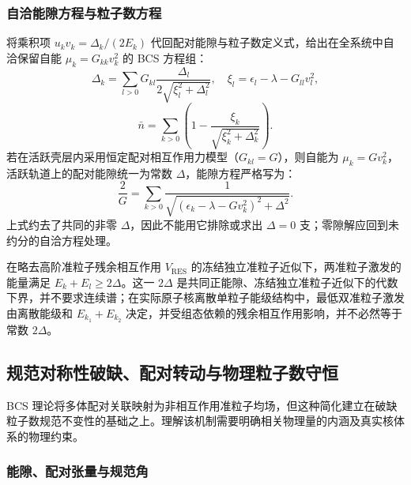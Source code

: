 \subsubsection{自洽能隙方程与粒子数方程}\label{sec:2-3-自洽能隙方程与粒子数方程}


将乘积项 $u_k v_k = \Delta_k / (2E_k)$ 代回配对能隙与粒子数定义式，给出在全系统中自洽保留自能 $\mu_k = G_{kk} v_k^2$ 的 BCS 方程组：
\begin{equation}\label{eq:2-3-24}
\Delta_k = \sum_{l > 0} G_{kl} \frac{\Delta_l}{2 \sqrt{\xi_l^2 + \Delta_l^2}}, \quad \xi_l = \epsilon_l - \lambda - G_{ll} v_l^2,
\end{equation}
\begin{equation}\label{eq:2-3-25}
\bar{n} = \sum_{k>0} \left( 1 - \frac{\xi_k}{\sqrt{\xi_k^2 + \Delta_k^2}} \right).
\end{equation}
若在活跃壳层内采用恒定配对相互作用力模型（$G_{kl} = G$），则自能为 $\mu_k = G v_k^2$，活跃轨道上的配对能隙统一为常数 $\Delta$，能隙方程严格写为：
\begin{equation}\label{eq:2-3-26}
\frac{2}{G} = \sum_{k>0} \frac{1}{\sqrt{(\epsilon_k - \lambda - G v_k^2)^2 + \Delta^2}}.
\end{equation}
上式约去了共同的非零 $\Delta$，因此不能用它排除或求出 $\Delta=0$ 支；零隙解应回到未约分的自洽方程处理。

在略去高阶准粒子残余相互作用 $V_{\mathrm{RES}}$ 的冻结独立准粒子近似下，两准粒子激发的能量满足 $E_k + E_l \ge 2\Delta$。这一 $2\Delta$ 是共同正能隙、冻结独立准粒子近似下的代数下界，并不要求连续谱；在实际原子核离散单粒子能级结构中，最低双准粒子激发由离散能级和 $E_{k_1} + E_{k_2}$ 决定，并受组态依赖的残余相互作用影响，并不必然等于常数 $2\Delta$。



\subsection{规范对称性破缺、配对转动与物理粒子数守恒}\label{sec:2-3-3}


BCS 理论将多体配对关联映射为非相互作用准粒子均场，但这种简化建立在破缺粒子数规范不变性的基础之上。理解该机制需要明确相关物理量的内涵及真实核体系的物理约束。


\subsubsection{能隙、配对张量与规范角}\label{sec:2-3-能隙配对张量与规范角}


